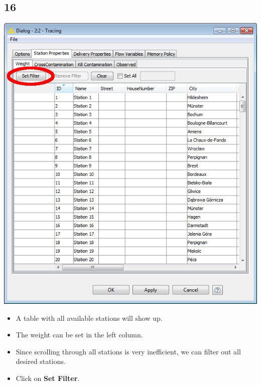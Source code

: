 \documentclass{beamer}
\begin{document}
\subsection{16}
\begin{frame}
	\begin{center}
  		\includegraphics[height=0.6\textheight]{16.png}
	\end{center}
	\begin{itemize}
		\item A table with all available stations will show up.
		\item The weight can be set in the left column.
		\item Since scrolling through all stations is very inefficient, we can filter out all desired stations.
		\item Click on \textbf{Set Filter}.
	\end{itemize}
\end{frame}
\end{document}
